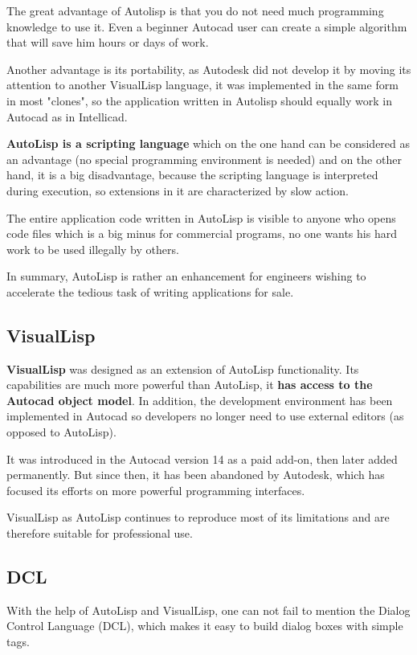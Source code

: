 \documentclass[a4paper, 11pt, article]{report}
\begin{document}
The great advantage of Autolisp is that you do not need much programming knowledge to use it. Even a beginner Autocad user can create a simple algorithm that will save him hours or days of work.

Another advantage is its portability, as Autodesk did not develop it by moving its attention to another VisualLisp language, it was implemented in the same form in most "clones", so the application written in Autolisp should equally work in Autocad as in Intellicad.

\textbf{AutoLisp is a scripting language} which on the one hand can be considered as an advantage (no special programming environment is needed) and on the other hand, it is a big disadvantage, because the scripting language is interpreted during execution, so extensions in it are characterized by slow action.

The entire application code written in AutoLisp is visible to anyone who opens code files which is a big minus for commercial programs, no one wants his hard work to be used illegally by others.

In summary, AutoLisp is rather an enhancement for engineers wishing to accelerate the tedious task of writing applications for sale.

\subsection{VisualLisp}

\textbf{VisualLisp} was designed as an extension of AutoLisp functionality. Its capabilities are much more powerful than AutoLisp, it \textbf{has access to the Autocad object model}. In addition, the development environment has been implemented in Autocad so developers no longer need to use external editors (as opposed to AutoLisp).

It was introduced in the Autocad version 14 as a paid add-on, then later added permanently. But since then, it has been abandoned by Autodesk, which has focused its efforts on more powerful programming interfaces.

VisualLisp as AutoLisp continues to reproduce most of its limitations and are therefore suitable for professional use.

\subsection{DCL}
   
With the help of AutoLisp and VisualLisp, one can not fail to mention the Dialog Control Language (DCL), which makes it easy to build dialog boxes with simple tags.
\end{document}
